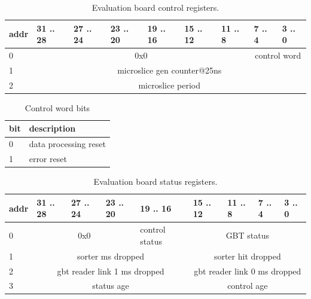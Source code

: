 \documentclass{article}
\begin{document}
\begin{table}[H]
\centering
\begin{tabular}{| l | l | l | l | l | l | l | l | l |}
\hline
addr & 31 .. 28 & 27 .. 24 & 23 .. 20 & 19 .. 16 & 15 .. 12 & 11 .. 8 & 7 .. 4 & 3 .. 0 \\ \hline
0 & \multicolumn{6}{c|}{0x0}  & \multicolumn{2}{c|}{control word} \\ \hline
1 & \multicolumn{8}{c|}{microslice gen counter@25ns}  \\ \hline
2 & \multicolumn{8}{c|}{microslice period}  \\ \hline
\end{tabular}
\caption{Evaluation board control registers.\label{tab11}}
\end{table}

\begin{table}[H]
\centering
\begin{tabular}{| l | l |}
\hline
bit & description \\ \hline
0 & data processing reset \\ \hline
1 & error reset \\ \hline
\end{tabular}
\caption{Control word bits\label{tab12}}
\end{table}



\begin{table}[H]
\centering
\begin{tabular}{| l | l | l | l | l | l | l | l | l |}
\hline
addr & 31 .. 28 & 27 .. 24 & 23 .. 20 & 19 .. 16 & 15 .. 12 & 11 .. 8 & 7 .. 4 & 3 .. 0 \\ \hline
0 & \multicolumn{3}{c|}{0x0} & control status  & \multicolumn{4}{c|}{GBT status} \\ \hline
1 & \multicolumn{4}{c|}{sorter ms dropped}  & \multicolumn{4}{c|}{sorter hit dropped} \\ \hline
2 & \multicolumn{4}{c|}{gbt reader link 1 ms dropped}  & \multicolumn{4}{c|}{gbt reader link 0 ms dropped} \\ \hline
3 & \multicolumn{4}{c|}{status age}& \multicolumn{4}{c|}{control age} \\ \hline

\end{tabular}
\caption{Evaluation board status registers.\label{tab13}}
\end{table}
\end{document}
